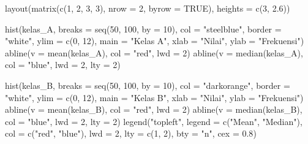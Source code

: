 \documentclass[
  indonesian,
  letterpaper,
]{book}
\newenvironment{Shaded}{\begin{snugshade}}{\end{snugshade}}
\newcommand{\AttributeTok}[1]{\textcolor[rgb]{0.40,0.45,0.13}{#1}}
\newcommand{\ConstantTok}[1]{\textcolor[rgb]{0.56,0.35,0.01}{#1}}
\newcommand{\DecValTok}[1]{\textcolor[rgb]{0.68,0.00,0.00}{#1}}
\newcommand{\FloatTok}[1]{\textcolor[rgb]{0.68,0.00,0.00}{#1}}
\newcommand{\FunctionTok}[1]{\textcolor[rgb]{0.28,0.35,0.67}{#1}}
\newcommand{\NormalTok}[1]{\textcolor[rgb]{0.00,0.23,0.31}{#1}}
\newcommand{\StringTok}[1]{\textcolor[rgb]{0.13,0.47,0.30}{#1}}
\begin{document}
\begin{Shaded}
\begin{Highlighting}[]
\FunctionTok{layout}\NormalTok{(}\FunctionTok{matrix}\NormalTok{(}\FunctionTok{c}\NormalTok{(}\DecValTok{1}\NormalTok{, }\DecValTok{2}\NormalTok{, }\DecValTok{3}\NormalTok{, }\DecValTok{3}\NormalTok{), }\AttributeTok{nrow =} \DecValTok{2}\NormalTok{, }\AttributeTok{byrow =} \ConstantTok{TRUE}\NormalTok{), }\AttributeTok{heights =} \FunctionTok{c}\NormalTok{(}\DecValTok{3}\NormalTok{, }\FloatTok{2.6}\NormalTok{))}

\FunctionTok{hist}\NormalTok{(kelas\_A, }\AttributeTok{breaks =} \FunctionTok{seq}\NormalTok{(}\DecValTok{50}\NormalTok{, }\DecValTok{100}\NormalTok{, }\AttributeTok{by =} \DecValTok{10}\NormalTok{), }\AttributeTok{col =} \StringTok{"steelblue"}\NormalTok{, }\AttributeTok{border =} \StringTok{"white"}\NormalTok{,}
\AttributeTok{ylim =} \FunctionTok{c}\NormalTok{(}\DecValTok{0}\NormalTok{, }\DecValTok{12}\NormalTok{), }\AttributeTok{main =} \StringTok{"Kelas A"}\NormalTok{, }\AttributeTok{xlab =} \StringTok{"Nilai"}\NormalTok{, }\AttributeTok{ylab =} \StringTok{"Frekuensi"}\NormalTok{)}
\FunctionTok{abline}\NormalTok{(}\AttributeTok{v =} \FunctionTok{mean}\NormalTok{(kelas\_A),   }\AttributeTok{col =} \StringTok{"red"}\NormalTok{,  }\AttributeTok{lwd =} \DecValTok{2}\NormalTok{)}
\FunctionTok{abline}\NormalTok{(}\AttributeTok{v =} \FunctionTok{median}\NormalTok{(kelas\_A), }\AttributeTok{col =} \StringTok{"blue"}\NormalTok{, }\AttributeTok{lwd =} \DecValTok{2}\NormalTok{, }\AttributeTok{lty =} \DecValTok{2}\NormalTok{)}

\FunctionTok{hist}\NormalTok{(kelas\_B, }\AttributeTok{breaks =} \FunctionTok{seq}\NormalTok{(}\DecValTok{50}\NormalTok{, }\DecValTok{100}\NormalTok{, }\AttributeTok{by =} \DecValTok{10}\NormalTok{), }\AttributeTok{col =} \StringTok{"darkorange"}\NormalTok{, }\AttributeTok{border =} \StringTok{"white"}\NormalTok{,}
\AttributeTok{ylim =} \FunctionTok{c}\NormalTok{(}\DecValTok{0}\NormalTok{, }\DecValTok{12}\NormalTok{), }\AttributeTok{main =} \StringTok{"Kelas B"}\NormalTok{, }\AttributeTok{xlab =} \StringTok{"Nilai"}\NormalTok{, }\AttributeTok{ylab =} \StringTok{"Frekuensi"}\NormalTok{)}
\FunctionTok{abline}\NormalTok{(}\AttributeTok{v =} \FunctionTok{mean}\NormalTok{(kelas\_B),   }\AttributeTok{col =} \StringTok{"red"}\NormalTok{,  }\AttributeTok{lwd =} \DecValTok{2}\NormalTok{)}
\FunctionTok{abline}\NormalTok{(}\AttributeTok{v =} \FunctionTok{median}\NormalTok{(kelas\_B), }\AttributeTok{col =} \StringTok{"blue"}\NormalTok{, }\AttributeTok{lwd =} \DecValTok{2}\NormalTok{, }\AttributeTok{lty =} \DecValTok{2}\NormalTok{)}
\FunctionTok{legend}\NormalTok{(}\StringTok{"topleft"}\NormalTok{, }\AttributeTok{legend =} \FunctionTok{c}\NormalTok{(}\StringTok{"Mean"}\NormalTok{, }\StringTok{"Median"}\NormalTok{), }\AttributeTok{col =} \FunctionTok{c}\NormalTok{(}\StringTok{"red"}\NormalTok{, }\StringTok{"blue"}\NormalTok{),}
\AttributeTok{lwd =} \DecValTok{2}\NormalTok{, }\AttributeTok{lty =} \FunctionTok{c}\NormalTok{(}\DecValTok{1}\NormalTok{, }\DecValTok{2}\NormalTok{), }\AttributeTok{bty =} \StringTok{"n"}\NormalTok{, }\AttributeTok{cex =} \FloatTok{0.8}\NormalTok{)}


\end{Highlighting}
\end{Shaded}
\end{document}
